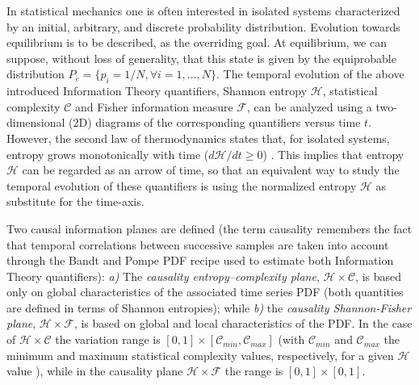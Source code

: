 In statistical mechanics one is often interested in isolated systems  characterized by an initial, arbitrary,
and discrete probability distribution. 
Evolution towards equilibrium is to be described, as the overriding goal.
At equilibrium, we can suppose, without loss of generality, that this state is given by the equiprobable 
distribution $P_e = \{ p_i = 1/N, \forall i=1, \ldots , N \}$.
The temporal evolution of the above introduced Information Theory quantifiers, Shannon entropy $\mathcal H$, 
statistical complexity $\mathcal C$ and Fisher information measure $\mathcal F$, can be analyzed using a 
two-dimensional (2D) diagrams of the corresponding quantifiers versus time $t$. 
However, the second law of thermodynamics states that, for isolated systems, entropy grows monotonically
with time ($d{\mathcal H}/dt \geq 0$) \cite{Plastino1996}. 
This implies that entropy ${\mathcal H}$ can be regarded as an arrow of time, so that an equivalent way
to study the temporal evolution of these quantifiers is using the normalized entropy ${\mathcal H}$ as 
substitute for the time-axis.

Two causal information planes are defined (the term causality remembers the fact that temporal correlations 
between successive samples are taken into account through the Bandt and Pompe PDF recipe used to
estimate both Information Theory quantifiers):
{\it a)\/} The {\it causality entropy--complexity plane\/}, ${\mathcal H} \times {\mathcal C}$, is based 
only on global characteristics of the associated time series PDF (both quantities are defined in terms of 
Shannon entropies); while 
{\it b)\/} the {\it causality Shannon-Fisher plane\/}, ${\mathcal H} \times {\mathcal F}$, is based on 
global and local characteristics of the PDF.
In the case of ${\mathcal H} \times {\mathcal C}$ the variation range is $[0, 1] \times [{\mathcal C}_{min}, 
{\mathcal C}_{max}]$ (with ${\mathcal C}_{min}$ and ${\mathcal C}_{max}$ the minimum and maximum statistical 
complexity values, respectively, for a given ${\mathcal H}$ value \cite{Martin2006}), while in the causality 
plane ${\mathcal H} \times {\mathcal F}$ the range is $[0, 1]\times [0, 1]$.

